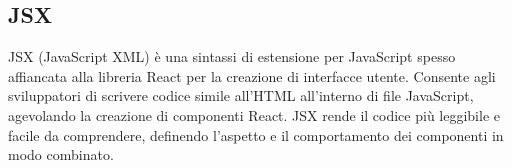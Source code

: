 \vspace{2em}
\subsection*{JSX}
\par JSX (JavaScript XML) è una sintassi di estensione per JavaScript spesso affiancata alla libreria React per la creazione di interfacce utente. Consente agli sviluppatori di scrivere codice simile all'HTML all'interno di file JavaScript, agevolando la creazione di componenti React. JSX rende il codice più leggibile e facile da comprendere, definendo l'aspetto e il comportamento dei componenti in modo combinato.
